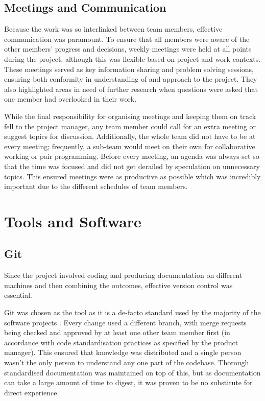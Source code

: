 \subsection{Meetings and Communication}
Because the work was so interlinked between team members, effective communication was paramount. To ensure that all members were aware of the other members' progress and decisions, weekly meetings were held at all points during the project, although this was flexible based on project and work contexts. These meetings served as key information sharing and problem solving sessions, ensuring both conformity in understanding of and approach to the project. They also highlighted areas in need of further research when questions were asked that one member had overlooked in their work. 

While the final responsibility for organising meetings and keeping them on track fell to the project manager, any team member could call for an extra meeting or suggest topics for discussion. Additionally, the whole team did not have to be at every meeting; frequently, a sub-team would meet on their own for collaborative working or pair programming. Before every meeting, an agenda was always set so that the time was focused and did not get derailed by speculation on unnecessary topics. This ensured meetings were as productive as possible which was incredibly important due to the different schedules of team members.

\section{Tools and Software}
\subsection{Git}
Since the project involved coding and producing documentation on different machines and then combining the outcomes, effective version control was essential.

Git was chosen as the tool as it is a de-facto standard used by the majority of the software projects \cite{stackoverflow_developer_survey}. Every change used a different branch, with merge requests being checked and approved by at least one other team member first (in accordance with code standardisation practices as specified by the product manager). This ensured that knowledge was distributed and a single person wasn't the only person to understand any one part of the codebase. Thorough standardised documentation was maintained on top of this, but as documentation can take a large amount of time to digest, it was proven to be no substitute for direct experience.

